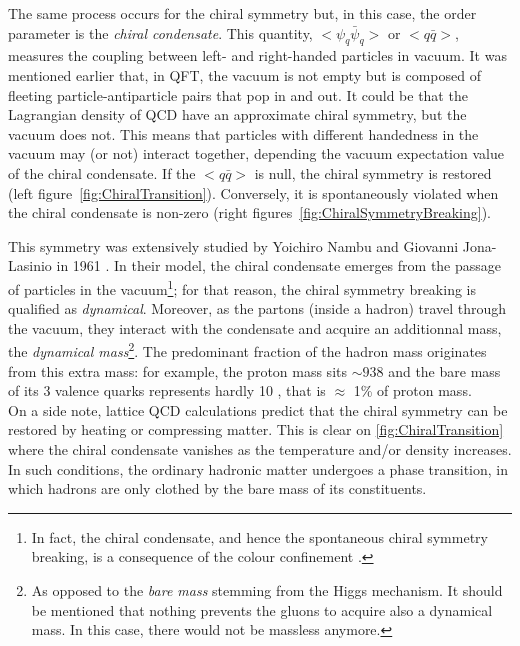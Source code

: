 The same process occurs for the chiral symmetry but, in this case, the order parameter is the \textit{chiral condensate}. This quantity, $< \psi_{q} \bar{\psi}_{q} > $ or $ < q \bar{q} >$, measures the coupling between left- and right-handed particles in vacuum. It was mentioned earlier that, in QFT, the vacuum is not empty but is composed of fleeting particle-antiparticle pairs that pop in and out. It could be that the Lagrangian density of QCD have an approximate chiral symmetry, but the vacuum does not. This means that particles with different handedness in the vacuum may (or not) interact together, depending the vacuum expectation value of the chiral condensate. If the $ < q \bar{q} >$ is null, the chiral symmetry is restored (left figure~\ref{fig:ChiralTransition}). Conversely, it is spontaneously violated when the chiral condensate is non-zero (right figures~\ref{fig:ChiralSymmetryBreaking}).

This symmetry was extensively studied by Yoichiro Nambu and Giovanni Jona-Lasinio in 1961 \cite{nambuDynamicalModelElementary1961}. In their model, the chiral condensate emerges from the passage of particles in the vacuum\footnote{In fact, the chiral condensate, and hence the spontaneous chiral symmetry breaking, is a consequence of the colour confinement \cite{peskinIntroductionQuantumField2018}.}; for that reason, the chiral symmetry breaking is qualified as \textit{dynamical}. Moreover, as the partons (inside a hadron) travel through the vacuum, they interact with the condensate and acquire an additionnal mass, the \textit{dynamical mass}\footnote{As opposed to the \textit{bare mass} stemming from the Higgs mechanism. It should be mentioned that nothing prevents the gluons to acquire also a dynamical mass. In this case, there would not be massless anymore.}. The predominant fraction of the hadron mass originates from this extra mass: for example, the proton mass sits $\sim 938$ \mmass and the bare mass of its 3 valence quarks represents hardly 10 \mmass, that is $\approx$ 1\% of proton mass.\\

On a side note, lattice QCD calculations predict that the chiral symmetry can be restored by heating or compressing matter. This is clear on \fig\ref{fig:ChiralTransition} where the chiral condensate vanishes as the temperature and/or density increases. In such conditions, the ordinary hadronic matter undergoes a phase transition, in which hadrons are only clothed by the bare mass of its constituents.


